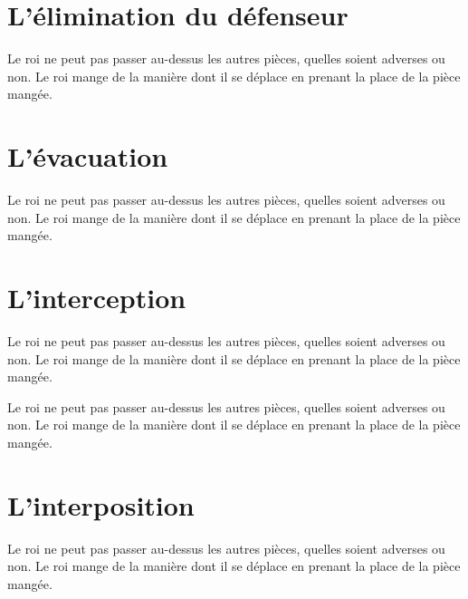 \documentclass[a5paper,openany,twocolumn]{book}%
\begin{document}

\chapter{L'élimination du défenseur}


Le roi ne peut pas passer au-dessus les autres pièces, quelles soient adverses ou non. Le roi mange de la manière dont il se déplace en prenant la place de la pièce mangée. 

\chapter{L'évacuation}

Le roi ne peut pas passer au-dessus les autres pièces, quelles soient adverses ou non. Le roi mange de la manière dont il se déplace en prenant la place de la pièce mangée. 


\chapter{L'interception}

Le roi ne peut pas passer au-dessus les autres pièces, quelles soient adverses ou non. Le roi mange de la manière dont il se déplace en prenant la place de la pièce mangée. 


Le roi ne peut pas passer au-dessus les autres pièces, quelles soient adverses ou non. Le roi mange de la manière dont il se déplace en prenant la place de la pièce mangée. 

\chapter{L'interposition}

Le roi ne peut pas passer au-dessus les autres pièces, quelles soient adverses ou non. Le roi mange de la manière dont il se déplace en prenant la place de la pièce mangée. 
\end{document}
